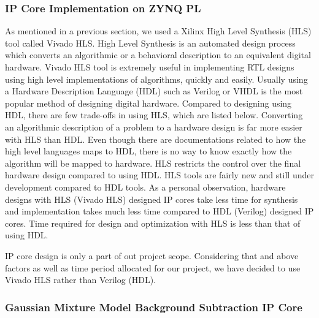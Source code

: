 \documentclass[12pt,a4paper]{report}
\begin{document}
\subsubsection{IP Core Implementation on ZYNQ PL}

As mentioned in a previous section, we used a Xilinx High Level Synthesis (HLS) tool called Vivado HLS. High Level Synthesis is an automated design process which converts an algorithmic or a behavioral description to an equivalent digital hardware. Vivado HLS tool is extremely useful in implementing RTL designs using high level implementations of algorithms, quickly and easily. 
Usually using a Hardware Description Language (HDL) such as Verilog or VHDL is the most popular method of designing digital hardware. Compared to designing using HDL, there are few trade-offs in using HLS, which are listed below.
Converting an algorithmic description of a problem to a hardware design is far more easier with HLS than HDL.
Even though there are documentations related to how the high level languages maps to HDL, there is no way to know exactly how the algorithm will be mapped to hardware.
HLS restricts the control over the final hardware design compared to using HDL.
HLS tools are fairly new and still under development compared to HDL tools.
As a personal observation, hardware designs with HLS (Vivado HLS) designed IP cores take less time for synthesis and implementation takes much less time compared to HDL (Verilog) designed IP cores.
Time required for design and optimization with HLS is less than that of using HDL.

IP core design is only a part of out project scope. Considering that and above factors as well as time period allocated for our project, we have decided to use Vivado HLS rather than Verilog (HDL). 


\subsubsection{Gaussian Mixture Model Background Subtraction IP Core}
\end{document}
